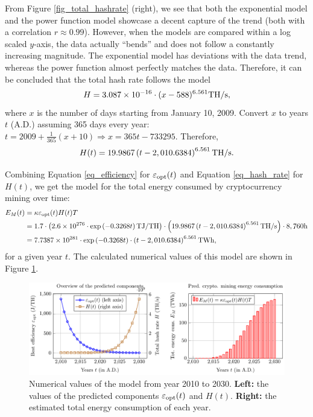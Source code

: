 \documentclass[12pt]{article}
\begin{document}
From Figure \ref{fig_total_hashrate} (right), we see that both the exponential model and the power function model showcase a decent capture of the trend (both with a correlation $r \approx 0.99$). However, when the models are compared within a log scaled $y$-axis, the data actually ``bends'' and does not follow a constantly increasing magnitude. The exponential model has deviations with the data trend, whereas the power function almost perfectly matches the data. Therefore, it can be concluded that the total hash rate follows the model
\begin{equation}
	H = 3.087 \times 10^{-16} \cdot (x - 588)^{6.561} \rm TH/s,
\end{equation}
where $x$ is the number of days starting from January 10, 2009. Convert $x$ to years $t$ (A.D.) assuming 365 days every year: $t = 2009 + \frac{1}{365}(x + 10) \Rightarrow x = 365 t - 733295$. Therefore,
\begin{equation}
	H(t) = 19.9867 \left( t - 2,010.6384 \right)^{6.561} \rm TH/s.
	\label{eq_hash_rate}
\end{equation}

Combining Equation \ref{eq_efficiency} for $\varepsilon_{\rm opt} (t)$ and Equation \ref{eq_hash_rate} for $H(t)$, we get the model for the total energy consumed by cryptocurrency mining over time:
\begin{equation}
	\begin{aligned}
		E_M (t) &= \kappa \varepsilon_{\rm opt} (t) H(t) T \\
		&= 1.7 \cdot \left(
			2.6 \times 10^{276} \cdot \exp \left(-0.3268t\right) {\rm TJ/TH}
		\right) \cdot \left(
			19.9867 \left( t - 2,010.6384 \right)^{6.561} {\rm TH/s}
		\right) \cdot 8,760 {\rm h} \\
		&= 7.7387 \times 10^{281} \cdot \exp \left(-0.3268t\right) \cdot \left( t - 2,010.6384 \right)^{6.561} {\rm TWh},
	\end{aligned}
\end{equation}
for a given year $t$. The calculated numerical values of this model are shown in Figure \ref{fig_crypto_energy_pred}.

\begin{figure}[!t]
	\centering
	\caption{Numerical values of the model from year 2010 to 2030. \textbf{Left:} the values of the predicted components $\varepsilon_{\rm opt}(t)$ and $H(t)$. \textbf{Right:} the estimated total energy consumption of each year.}
	\label{fig_crypto_energy_pred}
	\medskip
	\includegraphics{figures/trends/crypto_energy.pdf}
\end{figure}
\end{document}
